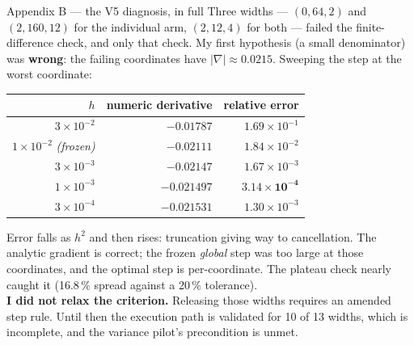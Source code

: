 \documentclass[aspectratio=169,10pt]{beamer}
\newcommand{\warn}[1]{\textcolor{warn}{#1}}
\begin{document}
\begin{frame}[t]{Appendix B --- the V5 diagnosis, in full}
  \vspace{0.4em}
  {\footnotesize Three widths --- $(0,64,2)$ and $(2,160,12)$ for the individual arm,
  $(2,12,4)$ for both --- failed the finite-difference check, and only that check. My
  first hypothesis (a small denominator) was \textbf{wrong}: the failing coordinates
  have $|\nabla| \approx 0.0215$. Sweeping the step at the worst coordinate:}
  \vspace{-0.2em}
  \begin{center}\footnotesize
  \begin{tabular}{@{}rrr@{}}
    \toprule
    $h$ & numeric derivative & relative error \\
    \midrule
    $3\times10^{-2}$ & $-0.01787$ & $1.69\times10^{-1}$ \\
    $1\times10^{-2}$ \emph{(frozen)} & $-0.02111$ & $1.84\times10^{-2}$ \\
    $3\times10^{-3}$ & $-0.02147$ & $1.67\times10^{-3}$ \\
    $1\times10^{-3}$ & $-0.021497$ & $\mathbf{3.14\times10^{-4}}$ \\
    $3\times10^{-4}$ & $-0.021531$ & $1.30\times10^{-3}$ \\
    \bottomrule
  \end{tabular}
  \end{center}
  \vspace{-0.3em}
  {\footnotesize Error falls as $h^2$ and then rises: truncation giving way to cancellation.
  The analytic gradient is correct; the frozen \emph{global} step was too large at those
  coordinates, and the optimal step is per-coordinate. The plateau check nearly caught
  it (16.8\,\% spread against a 20\,\% tolerance).
  \\[0.4em]
  \textbf{I did not relax the criterion.} Releasing those widths requires an amended
  step rule. Until then the execution path is validated for 10 of 13 widths, which is
  \warn{incomplete}, and the variance pilot's precondition is unmet.}
\end{frame}
\end{document}
